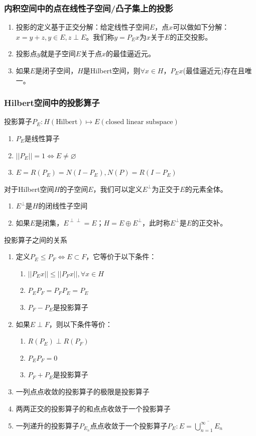 \documentclass[a4paper, 12pt]{ctexart}
\begin{document}
\subsubsection{内积空间中的点在线性子空间/凸子集上的投影}
\begin{enumerate}
    \item 投影的定义基于正交分解：给定线性子空间$E$，点$x$可以做如下分解：$x=y+z,y\in E,z\perp E$。我们称$y=P_E x$为$x$关于$E$的正交投影。
    \item 投影点$y$就是子空间$E$关于点$x$的最佳逼近元。
    \item 如果$E$是闭子空间，$H$是Hilbert空间，则$\forall x\in H$，$P_Ex$(最佳逼近元)存在且唯一。
\end{enumerate}
\subsubsection{Hilbert空间中的投影算子}
投影算子$P_E:H(\text{Hilbert})\mapsto E(\text{closed  linear subspace})$
\begin{enumerate}
    \item $P_E$是线性算子
    \item $||P_E||=1\iff E\neq\varnothing$
    \item $E=R(P_E)=N(I-P_E),N(P)=R(I-P_E)$
\end{enumerate}

对于Hilbert空间$H$的子空间$E$，我们可以定义$E^{\perp}$为正交于$E$的元素全体。
\begin{enumerate}
    \item $E^{\perp}$是$H$的闭线性子空间
    \item 如果$E$是闭集，$E^{\perp\perp}=E$；$H=E \oplus E^{\perp}$，此时称$E^{\perp}$是$E$的正交补。
\end{enumerate}

投影算子之间的关系
\begin{enumerate}
    \item 定义$P_E \leq P_F \iff E \subset F$，它等价于以下条件：
    \begin{enumerate}
        \item $||P_Ex||\leq||P_Fx||,\forall x \in H$
        \item $P_EP_F=P_FP_E=P_E$
        \item $P_F-P_E$是投影算子
    \end{enumerate} 
    \item 如果$E\perp F$，则以下条件等价：
    \begin{enumerate}
        \item $R(P_E)\perp R(P_F)$
        \item $P_EP_F=0$
        \item $P_F+P_E$是投影算子
    \end{enumerate}
    \item 一列点点收敛的投影算子的极限是投影算子
    \item 两两正交的投影算子的和点点收敛于一个投影算子
    \item 一列递升的投影算子$P_{E_n}$点点收敛于一个投影算子$P_E:E=\overline{\bigcup_{n=1}^\infty E_n}$
\end{enumerate}
\end{document}
